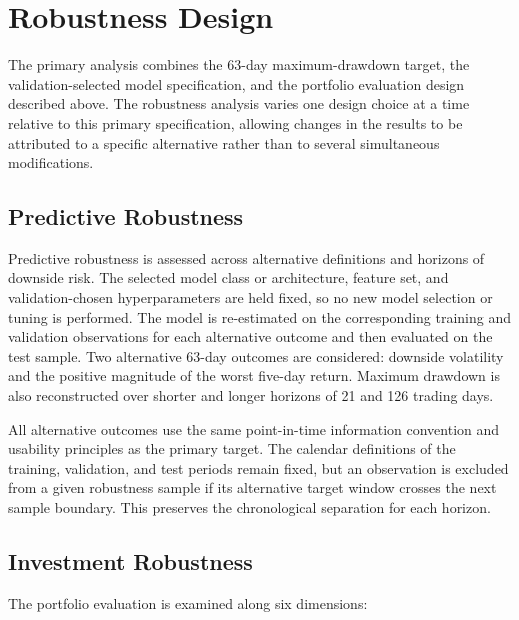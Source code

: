\section{Robustness Design}
\label{sec:robustness}

The primary analysis combines the 63-day maximum-drawdown target, the validation-selected model specification, and the portfolio evaluation design described above. The robustness analysis varies one design choice at a time relative to this primary specification, allowing changes in the results to be attributed to a specific alternative rather than to several simultaneous modifications.

\subsection{Predictive Robustness}

Predictive robustness is assessed across alternative definitions and horizons of downside risk. The selected model class or architecture, feature set, and validation-chosen hyperparameters are held fixed, so no new model selection or tuning is performed. The model is re-estimated on the corresponding training and validation observations for each alternative outcome and then evaluated on the test sample. Two alternative 63-day outcomes are considered: downside volatility and the positive magnitude of the worst five-day return. Maximum drawdown is also reconstructed over shorter and longer horizons of 21 and 126 trading days.

All alternative outcomes use the same point-in-time information convention and usability principles as the primary target. The calendar definitions of the training, validation, and test periods remain fixed, but an observation is excluded from a given robustness sample if its alternative target window crosses the next sample boundary. This preserves the chronological separation for each horizon.

\subsection{Investment Robustness}

The portfolio evaluation is examined along six dimensions:

